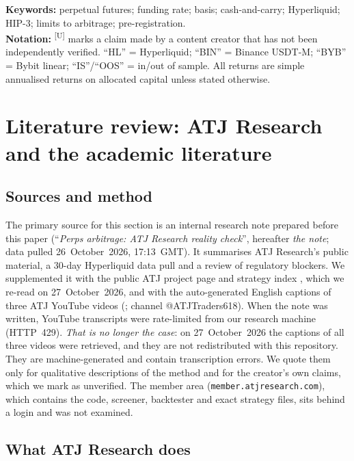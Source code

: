 \documentclass[11pt,a4paper]{article}
\newcommand{\unverified}{\textsuperscript{[U]}}
\begin{document}
\noindent\textbf{Keywords:} perpetual futures; funding rate; basis; cash-and-carry; Hyperliquid; HIP-3; limits to arbitrage; pre-registration.\\
\noindent\textbf{Notation:} \unverified{} marks a claim made by a content creator that has not been independently verified. ``HL'' = Hyperliquid; ``BIN'' = Binance USDT-M; ``BYB'' = Bybit linear; ``IS''/``OOS'' = in/out of sample. All returns are simple annualised returns on allocated capital unless stated otherwise.

{\small\tableofcontents}

\section{Literature review: ATJ Research and the academic literature}
\label{sec:lit}

\subsection{Sources and method}
The primary source for this section is an internal research note prepared before this paper (``\emph{Perps arbitrage: ATJ Research reality check}'', hereafter \emph{the note}; data pulled 26~October~2026, 17:13~GMT). It summarises ATJ Research's public material, a 30-day Hyperliquid data pull and a review of regulatory blockers.
We supplemented it with the public ATJ project page and strategy index \citep{atj_project,atj_strategies}, which we re-read on 27~October~2026, and with the auto-generated English captions of three ATJ YouTube videos (\citealp{atj_yt_bot,atj_yt_jpy,atj_yt_eur}; channel @ATJTraders618).
When the note was written, YouTube transcripts were rate-limited from our research machine (HTTP~429). \emph{That is no longer the case}: on 27~October~2026 the captions of all three videos were retrieved, and they are not redistributed with this repository. They are machine-generated and contain transcription errors. We quote them only for qualitative descriptions of the method and for the creator's own claims, which we mark as unverified.
The member area (\texttt{member.atjresearch.com}), which contains the code, screener, backtester and exact strategy files, sits behind a login and was not examined.

\subsection{What ATJ Research does}
\end{document}
